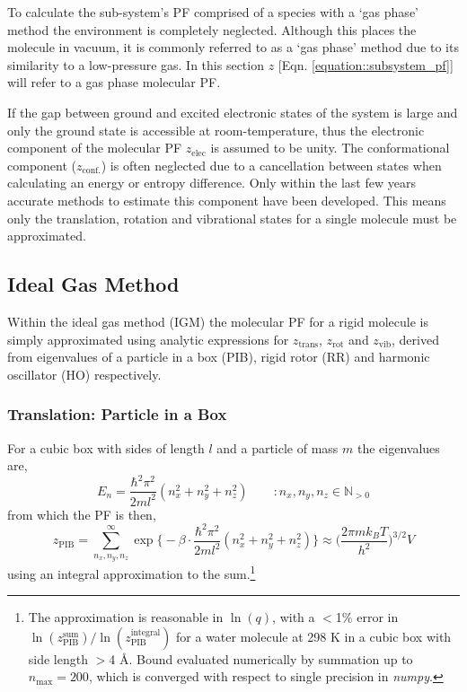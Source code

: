 \documentclass[../main.tex]{subfiles}
\begin{document}
To calculate the sub-system's PF comprised of a species with a `gas phase' method the environment is completely neglected. Although this places the molecule in vacuum, it is commonly referred to as a `gas phase' method due to its similarity to a low-pressure gas. In this section $z$ [Eqn. \eqref{equation::subsystem_pf}] will refer to a gas phase molecular PF.

If the gap between ground and excited electronic states of the system is large and only the ground state is accessible at room-temperature, thus the electronic component of the molecular PF $z_\text{elec}$ is assumed to be unity. The conformational component ($z_\text{conf.}$) is often neglected due to a cancellation between states when calculating an energy or entropy difference. Only within the last few years accurate methods to estimate this component have been developed.\cite{Chan2021, grimme2021} This means only the translation, rotation and vibrational states for a single molecule must be approximated.

\subsection{Ideal Gas Method}

Within the ideal gas method (IGM) the molecular PF for a rigid molecule is simply approximated using analytic expressions for $z_\text{trans}$, $z_\text{rot}$ and $z_\text{vib}$, derived from eigenvalues of a particle in a box (PIB), rigid rotor (RR) and harmonic oscillator (HO) respectively.\cite{mcquarrie200}

\subsubsection{Translation: Particle in a Box}

For a cubic box with sides of length $l$ and a particle of mass $m$ the eigenvalues are,
\begin{equation}
E_n = \frac{\hbar^2 \pi^2}{2ml^2}(n_x^2 + n_y^2 + n_z^2) \qquad :  n_x, n_y, n_z \in \mathbb{N}_{>0}
\end{equation}
from which the PF is then,
\begin{equation}
z_\text{PIB} = \sum_{n_x, n_y, n_z}^\infty \exp{ {\Big \{} -{\beta}\cdot  \frac{\hbar^2 \pi^2}{2ml^2}(n_x^2 + n_y^2 + n_z^2)}{\Big \}} \approx  {\Big (} \frac{2\pi m k_B T}{h^2} {\Big )}^{3/2} V 
\label{equation::z_pib_integral}
\end{equation}
using an integral approximation to the sum.\footnote{The approximation is reasonable in $\ln(q)$, with a $<$1\% error in  $\ln(z_\text{PIB}^\text{sum})/\ln(z_\text{PIB}^\text{integral})$ for a water molecule at 298 K in a cubic box with side length $>$4 \AA. Bound evaluated numerically by summation up to $n_\text{max} = 200$, which is converged with respect to single precision in \emph{numpy}.}
\end{document}
